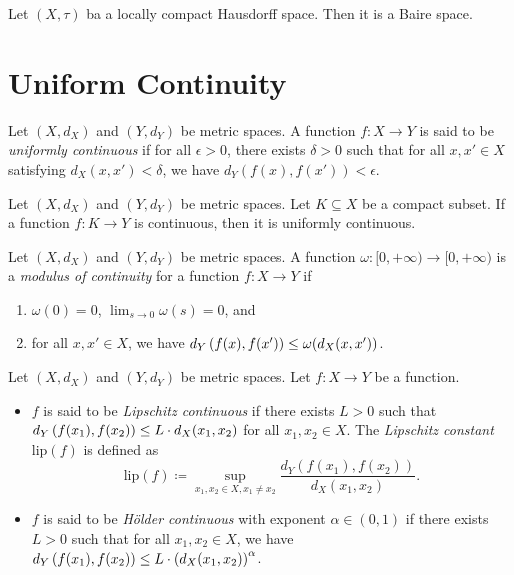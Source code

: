 \documentclass[screen,single]{techreport}
\numberwithin{equation}{section}
\begin{document}
\begin{theorem}\label{The:LocallyCompactT2ImplyBaire}
  Let $(X,\tau)$ ba a locally compact Hausdorff space.
  Then it is a Baire space.
\end{theorem}

\section{Uniform Continuity}

\begin{definition}\label{De:UniformContinuity}
  Let $(X,d_X)$ and $(Y,d_Y)$ be metric spaces.
  A function $f : X \to Y$ is said to be \emph{uniformly continuous} if for all $\epsilon > 0$, there exists $\delta >0$ such that for all $x,x' \in X$ satisfying $d_X(x,x') < \delta$, we have $d_Y(f(x),f(x')) < \epsilon$.
\end{definition}

\begin{proposition}\label{Prop:DomainCompactImplyContImplyUCont}
  Let $(X,d_X)$ and $(Y,d_Y)$ be metric spaces.
  Let $K \subseteq X$ be a compact subset.
  If a function $f : K \to Y$ is continuous, then it is uniformly continuous.
\end{proposition}

\begin{definition}\label{De:ModulusOfContinuity}
  Let $(X,d_X)$ and $(Y,d_Y)$ be metric spaces.
  A function $\omega : [0,+\infty) \to [0,+\infty)$ is a \emph{modulus of continuity} for a function $f : X \to Y$ if
  \begin{enumerate}
    \item $\omega(0) = 0$, $\lim_{s \to 0} \omega(s) = 0$, and
    \item for all $x,x' \in X$, we have $d_Y\left({f(x),f(x')}\right) \le \omega(d_X(x,x'))$.
  \end{enumerate}
\end{definition}

\begin{definition}\label{De:LipschitzHolder}
  Let $(X,d_X)$ and $(Y,d_Y)$ be metric spaces.
  Let $f : X \to Y$ be a function.
  \begin{itemize}
    \item $f$ is said to be \emph{Lipschitz continuous} if there exists $L > 0$ such that $d_Y\left({f(x_1),f(x_2)}\right) \le L \cdot d_X(x_1,x_2)$ for all $x_1,x_2 \in X$.
    The \emph{Lipschitz constant} $\mathrm{lip}(f)$ is defined as
    \[
    \mathrm{lip}(f) \coloneqq \sup_{x_1,x_2 \in X, x_1 \neq x_2} \frac{d_Y(f(x_1),f(x_2))}{d_X(x_1,x_2)}.
    \]
    \item $f$ is said to be \emph{H{\"o}lder continuous} with exponent $\alpha \in (0,1)$ if there exists $L > 0$ such that for all $x_1,x_2 \in X$, we have $d_Y\left({f(x_1),f(x_2)}\right) \le L \cdot \left({d_X(x_1,x_2)}\right)^\alpha$.
  \end{itemize}
\end{definition}
\end{document}
